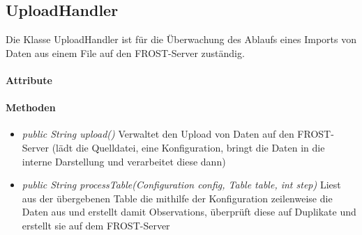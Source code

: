 \subsection{UploadHandler}
Die Klasse UploadHandler ist für die Überwachung des Ablaufs eines Imports von Daten aus einem File auf den FROST-Server zuständig.

\paragraph{Attribute}
\paragraph{Methoden}
\begin{itemize}
\item \textit{public String upload()} Verwaltet den Upload von Daten auf den FROST-Server (lädt die Quelldatei, eine Konfiguration, bringt die Daten in die interne Darstellung und verarbeitet diese dann)
\item \textit{public String processTable(Configuration config, Table table, int step)} Liest aus der übergebenen Table die mithilfe der Konfiguration zeilenweise die Daten aus und erstellt damit Observations, überprüft diese auf Duplikate und erstellt sie auf dem FROST-Server
\end{itemize}